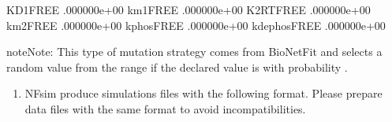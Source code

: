 \documentclass[letterpaper,10pt,english]{sphinxmanual}
\begin{document}
\begin{sphinxVerbatim}[commandchars=\\\{\}]
KD1\PYGZus{}\PYGZus{}FREE\PYGZus{}\PYGZus{}        .000000e+00 
km1\PYGZus{}\PYGZus{}FREE\PYGZus{}\PYGZus{}        .000000e+00 
K2RT\PYGZus{}\PYGZus{}FREE\PYGZus{}\PYGZus{}       .000000e+00 
km2\PYGZus{}\PYGZus{}FREE\PYGZus{}\PYGZus{}        .000000e+00 
kphos\PYGZus{}\PYGZus{}FREE\PYGZus{}\PYGZus{}      .000000e+00 
kdephos\PYGZus{}\PYGZus{}FREE\PYGZus{}\PYGZus{}    .000000e+00 
\end{sphinxVerbatim}

\begin{sphinxadmonition}{note}{Note:}
 This type of mutation strategy comes from BioNetFit and
selects a random value from the range 
if the declared value is  with probability .
\end{sphinxadmonition}
\begin{enumerate}
\def\theenumi{\arabic{enumi}}
\def\labelenumi{\theenumi .}
\makeatletter\def\p@enumii{\p@enumi \theenumi .}\makeatother
\setcounter{enumi}{1}
\item {} 

NFsim produce simulations files with the following format. Please prepare
data files with the same format to avoid incompatibilities.

\end{enumerate}
\end{document}
